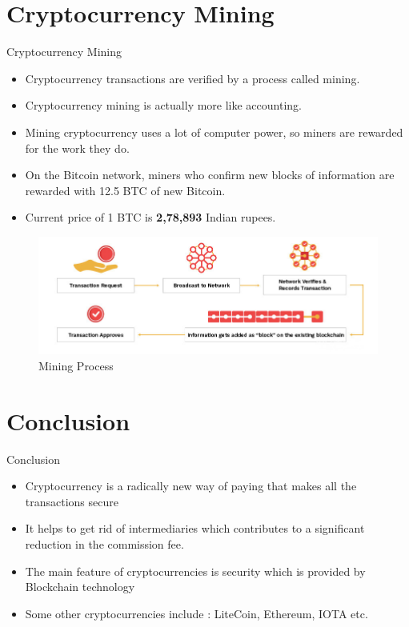 \documentclass{beamer}
\begin{document}
\section{Cryptocurrency Mining}

\begin{frame}{Cryptocurrency Mining}
    \begin{itemize}
        \item Cryptocurrency transactions are verified by a process called mining.
        \item Cryptocurrency mining is actually more like accounting.
        \item Mining cryptocurrency uses a lot of computer power, so miners are rewarded for the work they do.
        \item On the Bitcoin network, miners who confirm new blocks of information are rewarded with 12.5 BTC of new Bitcoin.
        \item Current price of 1 BTC is \textbf{2,78,893} Indian rupees.
    \end{itemize}
      
\end{frame}


\begin{frame}{}
    \begin{figure}
    \includegraphics[width=1\textwidth]{what-is-cryptocurrency-7.jpg}
    \caption{Mining Process}
\end{figure}
\end{frame}

\section{Conclusion}

\begin{frame}{Conclusion}
\begin{itemize}
    \item Cryptocurrency is a radically new way of paying that makes all the transactions secure 
    \item It helps to get rid of intermediaries which contributes to a significant reduction in the commission fee. 
    \item The main feature of cryptocurrencies is security which is provided by Blockchain technology %
    \item Some other cryptocurrencies include : LiteCoin, Ethereum, IOTA etc.
\end{itemize} 
\end{frame}
\end{document}
